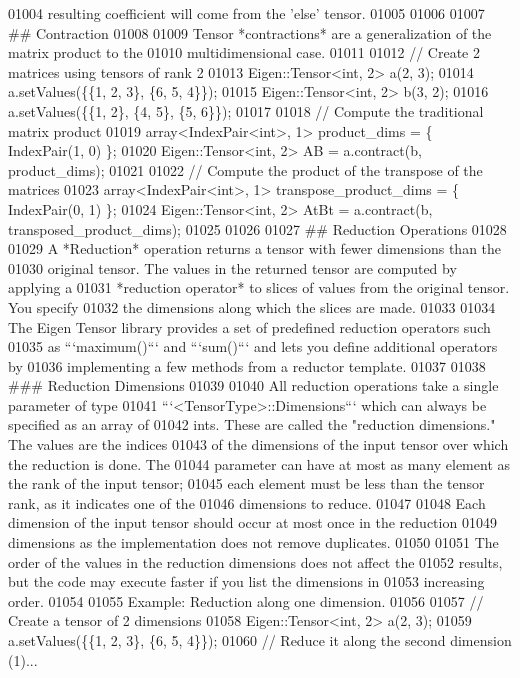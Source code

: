 \begin{DoxyCode}
01004 resulting coefficient will come from the 'else' tensor.
01005 
01006 
01007 ## Contraction
01008 
01009 Tensor *contractions* are a generalization of the matrix product to the
01010 multidimensional case.
01011 
01012     // Create 2 matrices using tensors of rank 2
01013     Eigen::Tensor<int, 2> a(2, 3);
01014     a.setValues(\{\{1, 2, 3\}, \{6, 5, 4\}\});
01015     Eigen::Tensor<int, 2> b(3, 2);
01016     a.setValues(\{\{1, 2\}, \{4, 5\}, \{5, 6\}\});
01017 
01018     // Compute the traditional matrix product
01019     array<IndexPair<int>, 1> product\_dims = \{ IndexPair(1, 0) \};
01020     Eigen::Tensor<int, 2> AB = a.contract(b, product\_dims);
01021 
01022     // Compute the product of the transpose of the matrices
01023     array<IndexPair<int>, 1> transpose\_product\_dims = \{ IndexPair(0, 1) \};
01024     Eigen::Tensor<int, 2> AtBt = a.contract(b, transposed\_product\_dims);
01025 
01026 
01027 ## Reduction Operations
01028 
01029 A *Reduction* operation returns a tensor with fewer dimensions than the
01030 original tensor.  The values in the returned tensor are computed by applying a
01031 *reduction operator* to slices of values from the original tensor.  You specify
01032 the dimensions along which the slices are made.
01033 
01034 The Eigen Tensor library provides a set of predefined reduction operators such
01035 as ```maximum()``` and ```sum()``` and lets you define additional operators by
01036 implementing a few methods from a reductor template.
01037 
01038 ### Reduction Dimensions
01039 
01040 All reduction operations take a single parameter of type
01041 ```<TensorType>::Dimensions``` which can always be specified as an array of
01042 ints.  These are called the "reduction dimensions."  The values are the indices
01043 of the dimensions of the input tensor over which the reduction is done.  The
01044 parameter can have at most as many element as the rank of the input tensor;
01045 each element must be less than the tensor rank, as it indicates one of the
01046 dimensions to reduce.
01047 
01048 Each dimension of the input tensor should occur at most once in the reduction
01049 dimensions as the implementation does not remove duplicates.
01050 
01051 The order of the values in the reduction dimensions does not affect the
01052 results, but the code may execute faster if you list the dimensions in
01053 increasing order.
01054 
01055 Example: Reduction along one dimension.
01056 
01057     // Create a tensor of 2 dimensions
01058     Eigen::Tensor<int, 2> a(2, 3);
01059     a.setValues(\{\{1, 2, 3\}, \{6, 5, 4\}\});
01060     // Reduce it along the second dimension (1)...

\end{DoxyCode}
